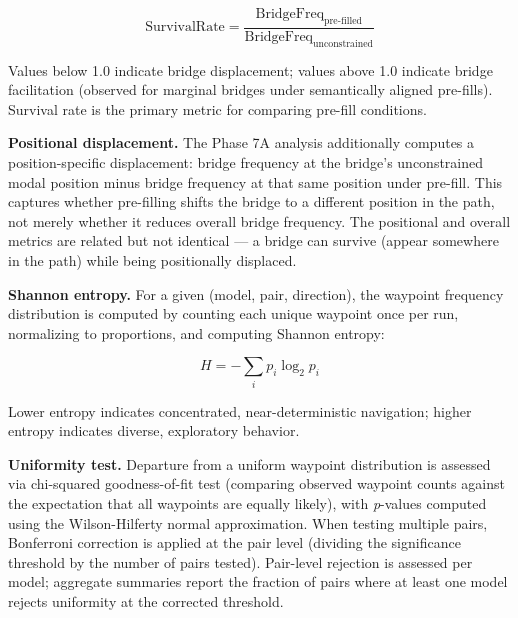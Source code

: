 \[\text{SurvivalRate} = \frac{\text{BridgeFreq}_{\text{pre-filled}}}{\text{BridgeFreq}_{\text{unconstrained}}}\]

Values below 1.0 indicate bridge displacement; values above 1.0 indicate bridge facilitation (observed for marginal bridges under semantically aligned pre-fills). Survival rate is the primary metric for comparing pre-fill conditions.

\textbf{Positional displacement.} The Phase 7A analysis additionally computes a position-specific displacement: bridge frequency at the bridge's unconstrained modal position minus bridge frequency at that same position under pre-fill. This captures whether pre-filling shifts the bridge to a different position in the path, not merely whether it reduces overall bridge frequency. The positional and overall metrics are related but not identical --- a bridge can survive (appear somewhere in the path) while being positionally displaced.

\textbf{Shannon entropy.} For a given (model, pair, direction), the waypoint frequency distribution is computed by counting each unique waypoint once per run, normalizing to proportions, and computing Shannon entropy:

\[H = -\sum_i p_i \log_2 p_i\]

Lower entropy indicates concentrated, near-deterministic navigation; higher entropy indicates diverse, exploratory behavior.

\textbf{Uniformity test.} Departure from a uniform waypoint distribution is assessed via chi-squared goodness-of-fit test (comparing observed waypoint counts against the expectation that all waypoints are equally likely), with \emph{p}-values computed using the Wilson-Hilferty normal approximation. When testing multiple pairs, Bonferroni correction is applied at the pair level (dividing the significance threshold by the number of pairs tested). Pair-level rejection is assessed per model; aggregate summaries report the fraction of pairs where at least one model rejects uniformity at the corrected threshold.

